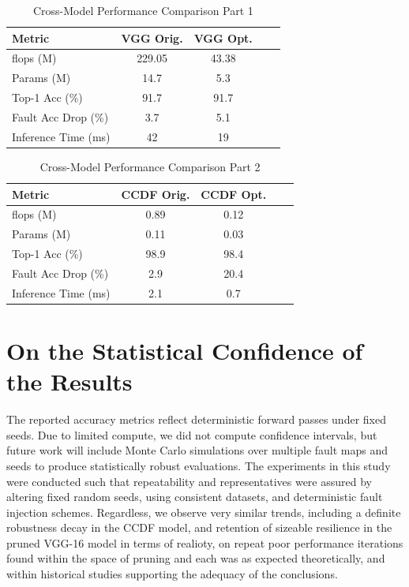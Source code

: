 \begin{table}[h]
    \centering
    \caption{Cross-Model Performance Comparison Part 1}
    \label{tab:performance1}
    \begin{tabular}{lcccc}
        \toprule
        \textbf{Metric} & \textbf{VGG Orig.} & \textbf{VGG Opt.}\\
        \midrule
        \gls{flops} (M) & 229.05 & 43.38  \\
        Params (M) & 14.7 & 5.3  \\
        Top-1 Acc (\%) & 91.7 & 91.7  \\
        Fault Acc Drop (\%) & 3.7 & 5.1  \\
        Inference Time (ms) & 42 & 19  \\
        \bottomrule
    \end{tabular}
\end{table}

\begin{table}[h]
    \centering
    \caption{Cross-Model Performance Comparison Part 2}
    \label{tab:performance2}
    \begin{tabular}{lcccc}
        \toprule
        \textbf{Metric} & \textbf{CCDF Orig.} & \textbf{CCDF Opt.} \\
        \midrule
        \gls{flops} (M) & 0.89 & 0.12 \\
        Params (M) & 0.11 & 0.03 \\
        Top-1 Acc (\%) & 98.9 & 98.4 \\
        Fault Acc Drop (\%) & 2.9 & 20.4 \\
        Inference Time (ms)& 2.1 & 0.7 \\
        \bottomrule
    \end{tabular}
\end{table}

\section{On the Statistical Confidence of the Results}

The reported accuracy metrics reflect deterministic forward passes under fixed seeds. Due to limited compute, we did not compute confidence intervals, but future work will include Monte Carlo simulations over multiple fault maps and seeds to produce statistically robust evaluations.
The experiments in this study were conducted such that repeatability and representatives were assured by altering fixed random seeds, using consistent datasets, and deterministic fault injection schemes. Regardless, we observe very similar trends, including a definite robustness decay in the CCDF model, and retention of sizeable resilience in the pruned VGG-16 model in terms of realioty, on repeat poor performance iterations found within the space of pruning and each was as expected theoretically, and within historical studies supporting the adequacy of the conclusions.
